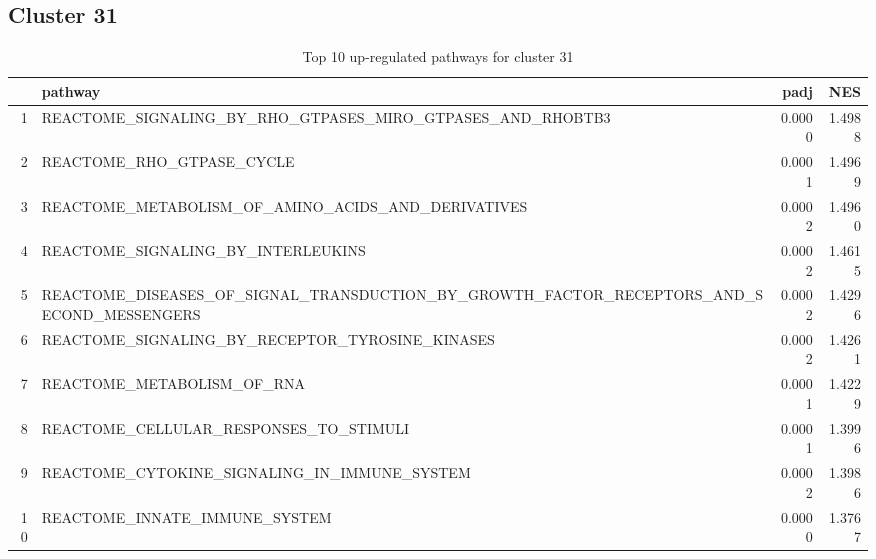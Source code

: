 \documentclass{article}
\begin{document}
\subsection{Cluster 31 }
\begin{table}[H]
\centering
\begin{tabularx}{\textwidth}{rlrr}
  \hline
 & pathway & padj & NES \\ 
  \hline
1 & REACTOME\_SIGNALING\_BY\_RHO\_GTPASES\_MIRO\_GTPASES\_AND\_RHOBTB3 & 0.0000 & 1.4988 \\ 
  2 & REACTOME\_RHO\_GTPASE\_CYCLE & 0.0001 & 1.4969 \\ 
  3 & REACTOME\_METABOLISM\_OF\_AMINO\_ACIDS\_AND\_DERIVATIVES & 0.0002 & 1.4960 \\ 
  4 & REACTOME\_SIGNALING\_BY\_INTERLEUKINS & 0.0002 & 1.4615 \\ 
  5 & REACTOME\_DISEASES\_OF\_SIGNAL\_TRANSDUCTION\_BY\_GROWTH\_FACTOR\_RECEPTORS\_AND\_SECOND\_MESSENGERS & 0.0002 & 1.4296 \\ 
  6 & REACTOME\_SIGNALING\_BY\_RECEPTOR\_TYROSINE\_KINASES & 0.0002 & 1.4261 \\ 
  7 & REACTOME\_METABOLISM\_OF\_RNA & 0.0001 & 1.4229 \\ 
  8 & REACTOME\_CELLULAR\_RESPONSES\_TO\_STIMULI & 0.0001 & 1.3996 \\ 
  9 & REACTOME\_CYTOKINE\_SIGNALING\_IN\_IMMUNE\_SYSTEM & 0.0002 & 1.3986 \\ 
  10 & REACTOME\_INNATE\_IMMUNE\_SYSTEM & 0.0000 & 1.3767 \\ 
   \hline
\end{tabularx}
\caption{Top 10 up-regulated pathways for cluster 31} 
\label{tab:q3_2_31}
\end{table}
\end{document}
